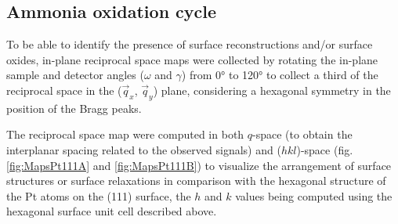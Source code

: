 

\subsection{Ammonia oxidation cycle}

To be able to identify the presence of surface reconstructions and/or surface oxides, in-plane reciprocal space maps were collected by rotating the in-plane sample and detector angles ($\omega$ and $\gamma$) from \ang{0} to \ang{120} to collect a third of the reciprocal space in the ($\vec{q}_x$, $\vec{q}_y$) plane, considering a hexagonal symmetry in the position of the Bragg peaks.

The reciprocal space map were computed in both $q$-space (to obtain the interplanar spacing related to the observed signals) and ($hkl$)-space (fig. \ref{fig:MapsPt111A} and \ref{fig:MapsPt111B}) to visualize the arrangement of surface structures or surface relaxations in comparison with the hexagonal structure of the Pt atoms on the (111) surface, the $h$ and $k$ values being computed using the hexagonal surface unit cell described above.



